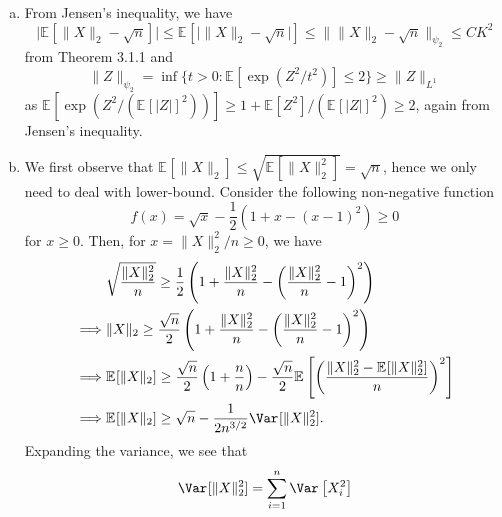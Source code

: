 \begin{answer}
	\begin{enumerate}[(a)]
		\item From Jensen's inequality, we have
		      \[
			      \vert \mathbb{E}_{}[\lVert X \rVert _2 - \sqrt{n} ]  \vert
			      \leq \mathbb{E}_{}[\vert \lVert X \rVert _2 - \sqrt{n}  \vert ]
			      \leq \lVert \lVert X \rVert _2 - \sqrt{n}  \rVert _{\psi _2}
			      \leq C K^2
		      \]
		      from Theorem 3.1.1 and
		      \[
			      \lVert Z \rVert _{\psi _2}
			      = \inf \{ t > 0 \colon \mathbb{E}_{}[\exp (Z^2 / t^2)] \leq 2 \}
			      \geq \lVert Z \rVert _{L^1}
		      \]
		      as \(\mathbb{E}_{}[\exp (Z^2 / (\mathbb{E}_{}[\vert Z \vert ] ^2 ))] \geq 1 + \mathbb{E}_{}[Z^2] / (\mathbb{E}_{}[\vert Z \vert ]^2 ) \geq 2\), again from Jensen's inequality.
		\item We first observe that \(\mathbb{E}_{}[\lVert X \rVert _2] \leq \sqrt{\mathbb{E}_{}[\lVert X \rVert _2^2] } = \sqrt{n} \), hence we only need to deal with lower-bound. Consider the following non-negative function
		      \[
			      f(x) = \sqrt{x} - \frac{1}{2}(1 + x - (x - 1)^2) \geq 0
		      \]
		      for \(x \geq 0\). Then, for \(x = \lVert X \rVert _2^2 / n \geq 0\), we have
		      \[
			      \begin{split}
				               & \sqrt{\frac{\lVert X \rVert _2^2}{n}}
				      \geq \frac{1}{2} \left( 1 + \frac{\lVert X \rVert _2^2}{n} - \left( \frac{\lVert X \rVert _2^2}{n} - 1 \right) ^2 \right)                                                                                                                    \\
				      \implies & \lVert X \rVert _2 \geq \frac{\sqrt{n} }{2} \left( 1 + \frac{\lVert X \rVert _2^2}{n} - \left( \frac{\lVert X \rVert _2^2}{n} - 1 \right) ^2 \right)                                                                              \\
				      \implies & \mathbb{E}_{}[\lVert X \rVert _2] \geq \frac{\sqrt{n} }{2} \left( 1 + \frac{n}{n} \right) - \frac{\sqrt{n} }{2}\mathbb{E}_{}\left[\left( \frac{\lVert X \rVert _2^2 - \mathbb{E}_{}[\lVert X \rVert _2^2] }{n} \right) ^2 \right] \\
				      \implies & \mathbb{E}_{}[\lVert X \rVert _2] \geq \sqrt{n} - \frac{1}{2 n^{3 / 2}} \Var_{}[\lVert X \rVert _2^2].
			      \end{split}
		      \]
		      Expanding the variance, we see that
		      \[
			      \Var_{}[\lVert X \rVert _2^2]
			      = \sum_{i=1}^{n} \Var_{}\left[X_i^2 \right]
\]
\end{enumerate}
\end{answer}
